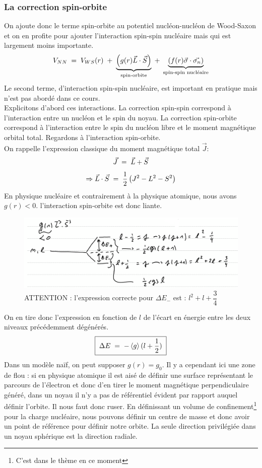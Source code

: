 \subsubsection{La correction spin-orbite}
On ajoute donc le terme spin-orbite au potentiel nucléon-nucléon de Wood-Saxon et on en profite pour ajouter l'interaction spin-spin nucléaire mais qui est largement moins importante.
\[
    V_{NN}\; = \; V_{WS}(r) 
    \; + \; \underbrace{\left(g(r)\vec{L}\cdot\vec{S}\right)}_\text{spin-orbite}
    \; + \; \underbrace{\left(f(r)\vec{\sigma}\cdot\vec{\sigma_n}\right)}_\text{spin-spin nucléaire}
\]
Le second terme, d'interaction spin-spin nucléaire, est important en pratique mais n'est pas abordé dans ce cours.\\
Explicitons d'abord ces interactions. La correction spin-spin correspond à l'interaction entre un nucléon et le spin du noyau. La correction spin-orbite correspond à l'interaction entre le spin du nucléon libre et le moment magnétique orbital total. Regardons à l'interaction spin-orbite.\\
On rappelle l'expression classique du moment magnétique total $\vec{J} :$
\[
    \vec{J} \; = \; \vec{L} + \vec{S}
\]
\[
    \Rightarrow \vec{L}\cdot\vec{S} \; = \; \dfrac{1}{2} \left(J^2 - L^2 - S^2\right)
\]
En physique nucléaire et contrairement à la physique atomique, nous avons $g(r) < 0$. l'interaction spin-orbite est donc liante.\\
\begin{figure}
    \centering
    \includegraphics[scale = 0.7]{Images4/spin-orbite_dégén.PNG}
    \caption{ATTENTION : l'expression correcte pour $\Delta E_-$ est : $l^2 + l +\dfrac{3}{4}$}
\end{figure}
On en tire donc l'expression en fonction de $l$ de l'écart en énergie entre les deux niveaux précédemment dégénérés.
\[
\boxed{
    \;\Delta E \; = \; -\expval{g}(l+\dfrac{1}{2})\;
    }
\]
Dans un modèle naïf, on peut supposer $g(r) = g_0$.
Il y a cependant ici une zone de flou : si en physique atomique il est aisé de définir une surface représentant le parcours de l'électron et donc d'en tirer le moment magnétique perpendiculaire généré, dans un noyau il n'y a pas de référentiel évident par rapport auquel définir l'orbite. Il nous faut donc ruser. En définissant un volume de confinement\footnote{C'est dans le thème en ce moment} pour la charge nucléaire, nous pouvons définir un centre de masse et donc avoir un point de référence pour définir notre orbite. La seule direction privilégiée dans un noyau sphérique est la direction radiale.
